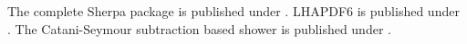 \documentclass{article}
\begin{document}
The complete Sherpa package is published under \cite{Gleisberg:2008ta}.
LHAPDF6 is published under \cite{Buckley:2014ana}.
The Catani-Seymour subtraction based shower is published under \cite{Schumann:2007mg}.
\end{document}
